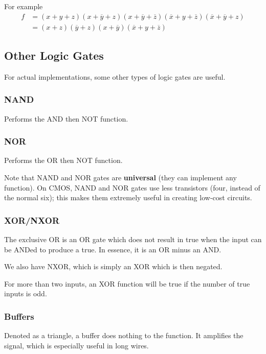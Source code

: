 \documentclass[12pt]{article}
\begin{document}
For example
\begin{align*}
f &= (x + y + z)(x + \overline{y} + z)(x + \overline{y} + \overline{z})(\overline{x} + y + \overline{z})(\overline{x} + \overline{y} + z)\\
  &= (x + z)(\overline{y} + z)(x + \overline{y})(\overline{x} + y + \overline{z})
\end{align*}

\subsection*{Other Logic Gates}
For actual implementations, some other types of logic gates are useful.

\subsubsection*{NAND}
Performs the AND then NOT function. 

\subsubsection*{NOR}
Performs the OR then NOT function. 

Note that NAND and NOR gates are {\bf universal} (they can implement any function). On CMOS, NAND and NOR gates use less transistors (four, instead of the normal six); this makes them extremely useful in creating low-cost circuits.

\subsubsection*{XOR/NXOR}
The exclusive OR is an OR gate which does not result in true when the input can be ANDed to produce a true. In essence, it is an OR minus an AND. 

We also have NXOR, which is simply an XOR which is then negated. 

For more than two inputs, an XOR function will be true if the number of true inputs is odd.

\subsubsection*{Buffers}
Denoted as a triangle, a buffer does nothing to the function. It amplifies the signal, which is especially useful in long wires.
\end{document}

